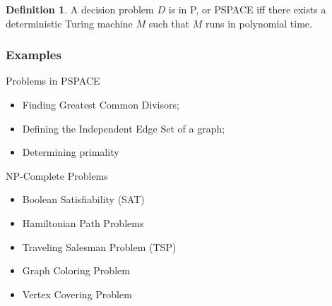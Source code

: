 \documentclass[11pt,letterpaper]{article}
\theoremstyle{definition}
\newtheorem{defn}{Definition}[section]
\begin{document}
\begin{defn}
	A decision problem \(D\) is in P, or PSPACE iff there exists a deterministic Turing machine \(M\) such that \(M\) runs in polynomial time.\autocite{leeuwen_1994}
\end{defn}
\newpage
\subsubsection{Examples}
\begin{multicols}{2}
	Problems in PSPACE
	\begin{itemize}
		\item Finding Greatest Common Divisors;
		\item Defining the Independent Edge Set of a graph;
		\item Determining primality
	\end{itemize}
	\columnbreak
	NP-Complete Problems
	\begin{itemize}
		\item Boolean Satisfiability (SAT)
		\item Hamiltonian Path Problems
		\item Traveling Salesman Problem (TSP)
		\item Graph Coloring Problem
		\item Vertex Covering Problem
	\end{itemize}
\end{multicols}
\end{document}
